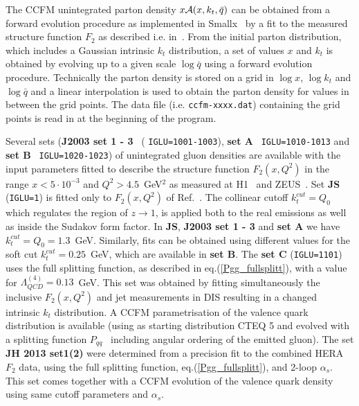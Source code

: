\documentclass[11pt]{article} \usepackage{mystyle-new}
\newcommand{\Pmax}{\bar{q}}
\newcommand{\kt}{k_{t}}
\newcommand{\SMALLXC}{SMALLXa,SMALLXb}
\def\SMALLX{{\sc Smallx}}
\begin{document}
The CCFM unintegrated parton density $x {\cal A}(x,k_{t},\Pmax)$ can be
obtained from a forward evolution procedure as implemented in
\SMALLX~\cite{\SMALLXC} by a fit to the measured structure function $F_2$ as
described i.e. in~\cite{CASCADE,jung_salam_2000}. 
From the initial parton distribution, which includes a Gaussian intrinsic $\kt$ distribution,
 a set of values $x$
and $k_{t}$ is obtained by evolving up to a given scale $\log
\Pmax$ using a forward evolution procedure. 
Technically the parton density is stored on a grid in $\log x$, $\log k_{t}$ and $\log \Pmax$ and a linear interpolation is used to obtain the parton density for values in between the grid points.
The data file (i.e. \verb+ccfm-xxxx.dat+) containing the  
grid points 
is read in at the beginning of the program.
\par
Several sets ({\bf J2003 set 1 - 3}~\cite{jung-dis03} (
\verb+IGLU=1001-1003+), 
{\bf set A}~\cite{jung-dis04} \verb+IGLU=1010-1013+ and 
{\bf set B}~\cite{jung-dis04} \verb+IGLU=1020-1023+) of
unintegrated gluon densities are available with 
the input parameters  fitted to
describe the structure function $F_2(x,Q^2)$ 
in the range $x < 5 \cdot 10^{-3}$ and  $Q^2 > 4.5$~GeV$^2$ 
as measured at H1~\cite{H1_F2_1996,H1_F2_2001} and  
ZEUS~\cite{ZEUS_F2_1996,ZEUS_F2_2001}. 
Set {\bf JS}~\cite{jung_salam_2000} (\verb+IGLU=1+) is fitted only to 
$F_2(x,Q^2)$ of Ref.~\cite{H1_F2_1996}.  
The collinear cutoff $\kt^{cut}=Q_0$ which regulates the region of  $z \to 1$, 
is applied both to the real emissions as well as inside the Sudakov form factor. 
 In {\bf JS}, {\bf J2003 set 1 - 3} and {\bf set A} we have 
$\kt^{cut}=Q_0=1.3$~GeV. 
Similarly, fits can be obtained using different values for the soft cut
$\kt^{cut}=0.25$~GeV, which are available in {\bf set B}. 
The {\bf set C} (\verb+IGLU=1101+)~\cite{jung-dis07} 
uses the full splitting function, as
described in eq.(\ref{Pgg_fullsplitt}), with a value for
$\Lambda^{(4)}_{QCD}=0.13$~GeV. This set was obtained by fitting simultaneously
the inclusive $F_2(x,Q^2)$ and jet measurements in DIS resulting in a changed 
 intrinsic $\kt$ distribution.
A CCFM parametrisation of the valence quark distribution is available (using as
starting distribution CTEQ 5 \cite{Lai:1999wy} and evolved with a splitting function
$P_{qq}$~\cite{Catani:1989sg} including angular ordering of the emitted gluon).
The set {\bf JH 2013 set1(2)}\cite{Hautmann:2013tba} were determined from a precision fit to the combined HERA $F_2$ data, using the full splitting function, eq.(\ref{Pgg_fullsplitt}), and 2-loop $\alpha_s$. This set comes together with a CCFM evolution of the valence quark density using same cutoff parameters and $\alpha_s$.
\end{document}
